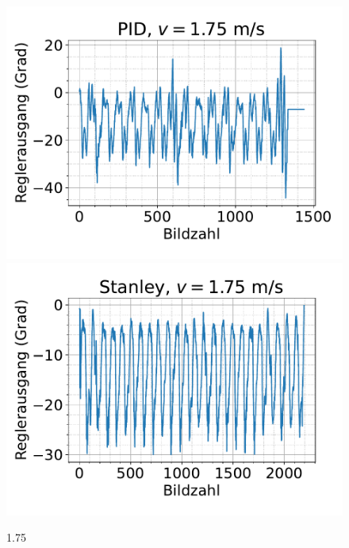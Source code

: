 \documentclass[arbeit=studie,oneside,BCOR=12mm]{ArbeitRST}
\begin{document}
\begin{figure}[h]
    \centering
    \includegraphics[scale=0.47]{pid1.75}
    \includegraphics[scale=0.47]{Stan1.75}
    \caption{1.75}
    \label{ausrei}
\end{figure}
\end{document}
